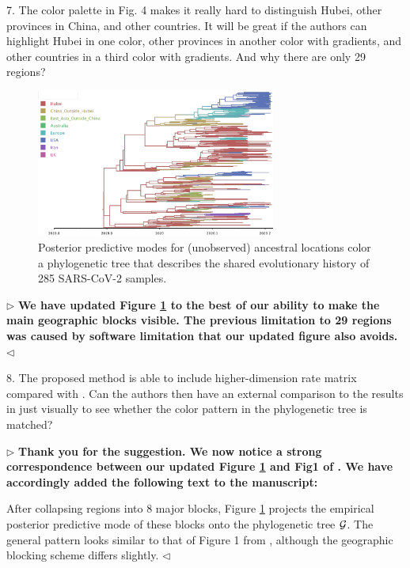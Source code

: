 \documentclass[12pt]{article}
\newenvironment{reply}{$\triangleright$\bfseries}{$\triangleleft$}
\renewenvironment{quote}
               {\list{}{\rightmargin\leftmargin}%
                \item\relax\normalfont}
               {\endlist}
\newcommand{\phylogeny}{{\cal G}}
\begin{document}
7.	The color palette in Fig. 4 makes it really hard to distinguish Hubei, other provinces in China, and other countries. It will be great if the authors can highlight Hubei in one color, other provinces in another color with gradients, and other countries in a third color with gradients. And why there are only 29 regions?


\setcounter{figure}{3}
\begin{figure}[!t]
	\centering
	\includegraphics[width=0.7\textwidth]{figures/summary2.tree.pdf}
	\vspace{-0.5em}
	\caption{Posterior predictive modes for (unobserved) ancestral
		locations color a phylogenetic tree that describes the
		shared evolutionary history of 285 SARS-CoV-2
		samples.}\label{fig:tree}
\end{figure}


\begin{reply}
We have updated Figure \ref{fig:tree} to the best of our ability to make the main geographic blocks visible.  The previous limitation to 29 regions was caused by software limitation that our updated figure also avoids.
\end{reply}


8.	The proposed method is able to include higher-dimension rate matrix compared with \citet{lemey2009bayesian,lemey2014unifying}. Can the authors then have an external comparison to the results in \citet{lemey2020accommodating} just visually to see whether the color pattern in the phylogenetic tree is matched?


\begin{reply}
	Thank you for the suggestion.  We now notice a strong correspondence between our updated Figure \ref{fig:tree} and Fig1 of \citet{lemey2020accommodating}.  We have accordingly added the following text to the manuscript:
	\begin{quote}
		After collapsing regions into 8 major blocks, Figure \ref{fig:tree} projects the empirical posterior predictive mode of these blocks onto the phylogenetic tree $\phylogeny$.  The general pattern looks similar to that of Figure 1 from \cite{lemey2020accommodating}, although the geographic blocking scheme differs slightly.
	\end{quote}
\end{reply}
\end{document}
